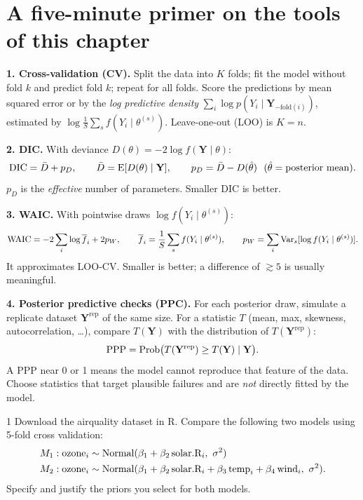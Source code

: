 \documentclass[11pt]{article}
\begin{document}
\section*{A five-minute primer on the tools of this chapter}

\begin{recall}
\textbf{1. Cross-validation (CV).} Split the data into $K$ folds; fit the model without fold $k$ and predict fold $k$; repeat for all folds. Score the predictions by mean squared error or by the \emph{log predictive density} $\sum_i\log p(Y_i\mid\mathbf Y_{-\text{fold}(i)})$, estimated by $\log\frac1S\sum_sf(Y_i\mid\theta^{(s)})$. Leave-one-out (LOO) is $K=n$.

\medskip
\textbf{2. DIC.} With deviance $D(\theta)=-2\log f(\mathbf Y\mid\theta)$:
\[
\text{DIC}=\bar D+p_D,\qquad\bar D=\E[D(\theta)\mid\mathbf Y],\qquad p_D=\bar D-D(\hat\theta)\ \ (\hat\theta=\text{posterior mean}).
\]
$p_D$ is the \emph{effective} number of parameters. Smaller DIC is better.

\medskip
\textbf{3. WAIC.} With pointwise draws $\log f(Y_i\mid\theta^{(s)})$:
\[
\text{WAIC}=-2\sum_i\log\overline{f}_i+2p_W,\qquad\overline f_i=\frac1S\sum_sf(Y_i\mid\theta^{(s)}),\qquad p_W=\sum_i\mathrm{Var}_s[\log f(Y_i\mid\theta^{(s)})].
\]
It approximates LOO-CV. Smaller is better; a difference of $\gtrsim5$ is usually meaningful.

\medskip
\textbf{4. Posterior predictive checks (PPC).} For each posterior draw, simulate a replicate dataset $\mathbf Y^{\text{rep}}$ of the same size. For a statistic $T$ (mean, max, skewness, autocorrelation, \ldots), compare $T(\mathbf Y)$ with the distribution of $T(\mathbf Y^{\text{rep}})$:
\[
\text{PPP}=\mathrm{Prob}\big(T(\mathbf Y^{\text{rep}})\ge T(\mathbf Y)\mid\mathbf Y\big).
\]
A PPP near 0 or 1 means the model cannot reproduce that feature of the data. Choose statistics that target plausible failures and are \emph{not} directly fitted by the model.
\end{recall}

\clearpage


\begin{problem}{1}
Download the airquality dataset in R. Compare the following two models using 5-fold cross validation:
\begin{align*}
M_1&: \text{ozone}_i\sim\dist{Normal}(\beta_1+\beta_2\,\text{solar.R}_i,\ \sigma^2)\\
M_2&: \text{ozone}_i\sim\dist{Normal}(\beta_1+\beta_2\,\text{solar.R}_i+\beta_3\,\text{temp}_i+\beta_4\,\text{wind}_i,\ \sigma^2).
\end{align*}
Specify and justify the priors you select for both models.
\end{problem}
\end{document}
